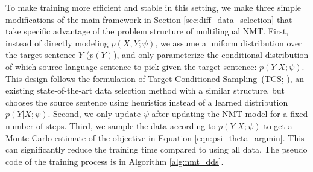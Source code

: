 To make training more efficient and stable in this setting, we make three simple modifications of the main framework in Section \ref{sec:diff_data_selection} that take specific advantage of the problem structure of multilingual NMT.
First, instead of directly modeling $p(X,Y;\psi)$, we assume a uniform distribution over the target sentence $Y$ ($p(Y)$), and only parameterize the conditional distribution of which source language sentence to pick given the target sentence: $p(Y|X;\psi)$. This design follows the formulation of Target Conditioned Sampling~(TCS; \citet{TCS}), an existing state-of-the-art data selection method with a similar structure, but chooses the source sentence using heuristics instead of a learned distribution $p(Y|X;\psi)$.
Second, we only update $\psi$ after updating the NMT model for a fixed number of steps.
Third, we sample the data according to $p(Y|X;\psi)$ to get a Monte Carlo estimate of the objective in Equation \ref{eqn:psi_theta_argmin}.
This can significantly reduce the training time compared to using all data.
The pseudo code of the training process is in Algorithm \ref{alg:nmt_dds}.


 
